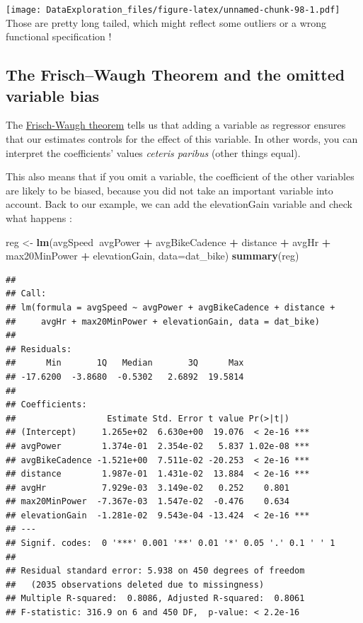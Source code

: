 \documentclass[
]{book}
\newenvironment{Shaded}{\begin{snugshade}}{\end{snugshade}}
\newcommand{\DataTypeTok}[1]{\textcolor[rgb]{0.13,0.29,0.53}{#1}}
\newcommand{\KeywordTok}[1]{\textcolor[rgb]{0.13,0.29,0.53}{\textbf{#1}}}
\newcommand{\NormalTok}[1]{#1}
\newcommand{\OperatorTok}[1]{\textcolor[rgb]{0.81,0.36,0.00}{\textbf{#1}}}
\newcommand{\StringTok}[1]{\textcolor[rgb]{0.31,0.60,0.02}{#1}}
\begin{document}
\texttt{[image: DataExploration\_files/figure-latex/unnamed-chunk-98-1.pdf]}
Those are pretty long tailed, which might reflect some outliers or a wrong functional specification !

\hypertarget{the-frischwaugh-theorem-and-the-omitted-variable-bias}{%
\subsection{The Frisch--Waugh Theorem and the omitted variable bias}\label{the-frischwaugh-theorem-and-the-omitted-variable-bias}}

The \href{https://en.wikipedia.org/wiki/Frisch\%E2\%80\%93Waugh\%E2\%80\%93Lovell_theorem}{Frisch-Waugh theorem} tells us that adding a variable as regressor ensures that our estimates controls for the effect of this variable. In other words, you can interpret the coefficients' values \emph{ceteris paribus} (other things equal).

This also means that if you omit a variable, the coefficient of the other variables are likely to be biased, because you did not take an important variable into account. Back to our example, we can add the elevationGain variable and check what happens :

\begin{Shaded}
\begin{Highlighting}[]
\NormalTok{reg <-}\StringTok{ }\KeywordTok{lm}\NormalTok{(avgSpeed}\OperatorTok{~}\NormalTok{avgPower }\OperatorTok{+}\StringTok{ }\NormalTok{avgBikeCadence }\OperatorTok{+}\StringTok{ }\NormalTok{distance }\OperatorTok{+}\StringTok{ }\NormalTok{avgHr }\OperatorTok{+}\StringTok{ }\NormalTok{max20MinPower }\OperatorTok{+}\StringTok{ }\NormalTok{elevationGain, }\DataTypeTok{data=}\NormalTok{dat_bike)}
\KeywordTok{summary}\NormalTok{(reg)}
\end{Highlighting}
\end{Shaded}

\begin{verbatim}
## 
## Call:
## lm(formula = avgSpeed ~ avgPower + avgBikeCadence + distance + 
##     avgHr + max20MinPower + elevationGain, data = dat_bike)
## 
## Residuals:
##      Min       1Q   Median       3Q      Max 
## -17.6200  -3.8680  -0.5302   2.6892  19.5814 
## 
## Coefficients:
##                  Estimate Std. Error t value Pr(>|t|)    
## (Intercept)     1.265e+02  6.630e+00  19.076  < 2e-16 ***
## avgPower        1.374e-01  2.354e-02   5.837 1.02e-08 ***
## avgBikeCadence -1.521e+00  7.511e-02 -20.253  < 2e-16 ***
## distance        1.987e-01  1.431e-02  13.884  < 2e-16 ***
## avgHr           7.929e-03  3.149e-02   0.252    0.801    
## max20MinPower  -7.367e-03  1.547e-02  -0.476    0.634    
## elevationGain  -1.281e-02  9.543e-04 -13.424  < 2e-16 ***
## ---
## Signif. codes:  0 '***' 0.001 '**' 0.01 '*' 0.05 '.' 0.1 ' ' 1
## 
## Residual standard error: 5.938 on 450 degrees of freedom
##   (2035 observations deleted due to missingness)
## Multiple R-squared:  0.8086,	Adjusted R-squared:  0.8061 
## F-statistic: 316.9 on 6 and 450 DF,  p-value: < 2.2e-16
\end{verbatim}
\end{document}
